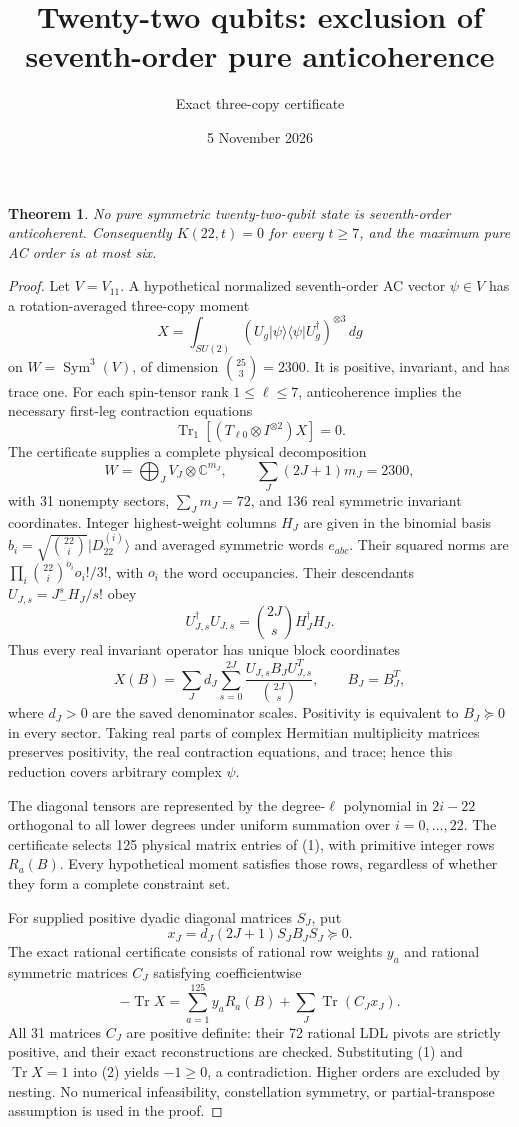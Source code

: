 \documentclass[11pt]{article}
\newtheorem{theorem}{Theorem}
\newcommand{\Tr}{\operatorname{Tr}}
\begin{document}
\title{Twenty-two qubits: exclusion of seventh-order pure anticoherence}
\author{Exact three-copy certificate}\date{5 November 2026}\maketitle
\begin{theorem}
No pure symmetric twenty-two-qubit state is seventh-order anticoherent.
Consequently $K(22,t)=0$ for every $t\ge7$, and the maximum pure AC order is at most six.
\end{theorem}
\begin{proof}
Let $V=V_{11}$. A hypothetical normalized seventh-order AC vector $\psi\in V$ has a rotation-averaged three-copy moment
\[
X=\int_{SU(2)}(U_g|\psi\rangle\langle\psi|U_g^\dagger)^{\otimes3}\,dg
\]
on $W=\operatorname{Sym}^3(V)$, of dimension $\binom{25}{3}=2300$.
It is positive, invariant, and has trace one. For each spin-tensor rank $1\le\ell\le7$, anticoherence implies the necessary first-leg contraction equations
\[
\Tr_1[(T_{\ell0}\otimes I^{\otimes2})X]=0. \tag{1}
\]
The certificate supplies a complete physical decomposition
\[
W=\bigoplus_J V_J\otimes\mathbb C^{m_J},\qquad
\sum_J(2J+1)m_J=2300,
\]
with 31 nonempty sectors, $\sum_Jm_J=72$, and 136 real symmetric invariant coordinates. Integer highest-weight columns $H_J$ are given in the binomial basis $b_i=\sqrt{\binom{22}{i}}|D_{22}^{(i)}\rangle$ and averaged symmetric words $e_{abc}$. Their squared norms are $\prod_i\binom{22}{i}^{o_i}o_i!/3!$, with $o_i$ the word occupancies. Their descendants $U_{J,s}=J_-^sH_J/s!$ obey
\[
U_{J,s}^\dagger U_{J,s}=\binom{2J}{s}H_J^\dagger H_J.
\]
Thus every real invariant operator has unique block coordinates
\[
X(B)=\sum_Jd_J\sum_{s=0}^{2J}\frac{U_{J,s}B_JU_{J,s}^T}{\binom{2J}{s}},\qquad B_J=B_J^T,
\]
where $d_J>0$ are the saved denominator scales. Positivity is equivalent to $B_J\succeq0$ in every sector. Taking real parts of complex Hermitian multiplicity matrices preserves positivity, the real contraction equations, and trace; hence this reduction covers arbitrary complex $\psi$.

The diagonal tensors are represented by the degree-$\ell$ polynomial in $2i-22$ orthogonal to all lower degrees under uniform summation over $i=0,\ldots,22$. The certificate selects 125 physical matrix entries of (1), with primitive integer rows $R_a(B)$. Every hypothetical moment satisfies those rows, regardless of whether they form a complete constraint set.

For supplied positive dyadic diagonal matrices $S_J$, put
\[
x_J=d_J(2J+1)S_JB_JS_J\succeq0.
\]
The exact rational certificate consists of rational row weights $y_a$ and rational symmetric matrices $C_J$ satisfying coefficientwise
\[
\boxed{-\Tr X=\sum_{a=1}^{125}y_aR_a(B)+\sum_J\Tr(C_Jx_J).} \tag{2}
\]
All 31 matrices $C_J$ are positive definite: their 72 rational LDL pivots are strictly positive, and their exact reconstructions are checked. Substituting (1) and $\Tr X=1$ into (2) yields $-1\ge0$, a contradiction. Higher orders are excluded by nesting. No numerical infeasibility, constellation symmetry, or partial-transpose assumption is used in the proof.
\end{proof}
\end{document}
